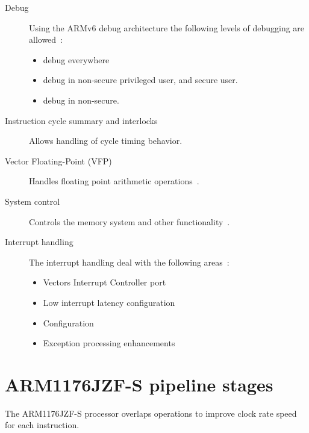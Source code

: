 \documentclass[11pt]{report}
\begin{document}
\begin{description}
\item [Debug] Using the ARMv6 debug architecture the following levels of debugging are allowed~\citep[1-18]{arm1176jzf-s}:
\begin{itemize}
\item debug everywhere
\item debug in non-secure privileged user, and secure user.
\item debug in non-secure.
\end{itemize}
\item [Instruction cycle summary and interlocks] Allows handling of cycle timing behavior.
\item [Vector Floating-Point (VFP)] Handles floating point arithmetic operations~\citep[1-19]{arm1176jzf-s}.
\item [System control] Controls the memory system and other functionality~\citep[1-21]{arm1176jzf-s}.
\item [Interrupt handling] The interrupt handling deal with the following areas~\citep[1-21]{arm1176jzf-s}:
\begin{itemize}
\item Vectors Interrupt Controller port
\item Low interrupt latency configuration
\item Configuration
\item Exception processing enhancements
\end{itemize}
\end{description}
\section{ARM1176JZF-S pipeline stages}
\begin{doublespace}
The ARM1176JZF-S  processor overlaps operations to improve clock rate speed for each instruction. 
\end{doublespace}
\end{document}
